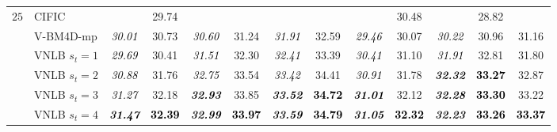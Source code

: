 \documentclass[10pt, a4paper]{article}
\newcommand{\best}[1]{#1}
\newcommand{\bsic}[1]{\textcolor{black}{\textit{#1}}}
\newcommand{\Bsic}[1]{\textcolor{black}{\textbf{\textit{#1}}}}
\newcommand{\Best}[1]{\textbf{\textcolor{black}{#1}}}
\begin{document}
\begin{table}[htp!]
\begin{center}
{\begin{tabular}{ c | l |c c | c c | c c | c c | c c | c}
%
%
			\multirow{1}{*}{$25$}
			                      & CIFIC                & \bsic{     } &       29.74  & \bsic{     } &              & \bsic{     } &              & \bsic{     } &       30.48  & \bsic{     } &       28.82  &              \\
			                      & V-BM4D-mp            & \bsic{30.01} &       30.73  & \bsic{30.60} &       31.24  & \bsic{31.91} &       32.59  & \bsic{29.46} &       30.07  & \bsic{30.22} &       30.96  &       31.16  \\
			                      & VNLB   $s_t = 1$     & \bsic{29.69} &       30.41  & \bsic{31.51} &       32.30  & \bsic{32.41} &       33.39  & \bsic{30.41} &       31.10  & \bsic{31.91} &       32.81  &       31.80  \\
			                      & VNLB   $s_t = 2$     & \bsic{30.88} &       31.76  & \bsic{32.75} &       33.54  & \bsic{33.42} &       34.41  & \bsic{30.91} &       31.78  & \Bsic{32.32} & \Best{33.27} &       32.87  \\
			                      & VNLB   $s_t = 3$     & \bsic{31.27} &       32.18  & \Bsic{32.93} &       33.85  & \Bsic{33.52} & \Best{34.72} & \Bsic{31.01} &       32.12  & \Bsic{32.28} & \Best{33.30} &       33.22  \\
			                      & VNLB   $s_t = 4$     & \Bsic{31.47} & \Best{32.39} & \Bsic{32.99} & \Best{33.97} & \Bsic{33.59} & \Best{34.79} & \Bsic{31.05} & \Best{32.32} & \Bsic{32.23} & \Best{33.26} & \Best{33.37} \\\hline

\end{tabular}}
\end{center}
\end{table}
\end{document}

